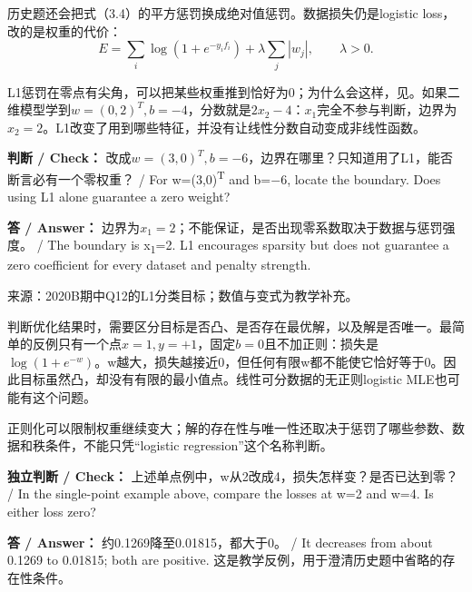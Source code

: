 

历史题还会把式（3.4）的平方惩罚换成绝对值惩罚。数据损失仍是logistic loss，改的是权重的代价：
\[
E=\sum_i\log(1+e^{-y_i f_i})+\lambda\sum_j|w_j|,\qquad\lambda>0.
\tag{3.6a}
\]


L1惩罚在零点有尖角，可以把某些权重推到恰好为0；为什么会这样，见。如果二维模型学到\(w=(0,2)^T,b=-4\)，分数就是\(2x_2-4\)：\(x_1\)完全不参与判断，边界为\(x_2=2\)。L1改变了用到哪些特征，并没有让线性分数自动变成非线性函数。


\textbf{判断 / Check：} 改成\(w=(3,0)^T,b=-6\)，边界在哪里？只知道用了L1，能否断言必有一个零权重？ / For w=(3,0)\textsuperscript{T} and b=\ensuremath{-}6, locate the boundary. Does using L1 alone guarantee a zero weight?


\textbf{答 / Answer：} 边界为\(x_1=2\)；不能保证，是否出现零系数取决于数据与惩罚强度。 / The boundary is x\textsubscript{1}=2. L1 encourages sparsity but does not guarantee a zero coefficient for every dataset and penalty strength.


来源：2020B期中Q12的L1分类目标；数值与变式为教学补充。








判断优化结果时，需要区分目标是否凸、是否存在最优解，以及解是否唯一。最简单的反例只有一个点\(x=1,y=+1\)，固定\(b=0\)且不加正则：损失是\(\log(1+e^{-w})\)。w越大，损失越接近0，但任何有限w都不能使它恰好等于0。因此目标虽然凸，却没有有限的最小值点。线性可分数据的无正则logistic MLE也可能有这个问题。


正则化可以限制权重继续变大；解的存在性与唯一性还取决于惩罚了哪些参数、数据和秩条件，不能只凭“logistic regression”这个名称判断。


\textbf{独立判断 / Check：} 上述单点例中，w从2改成4，损失怎样变？是否已达到零？ / In the single-point example above, compare the losses at w=2 and w=4. Is either loss zero?


\textbf{答 / Answer：} 约0.1269降至0.01815，都大于0。 / It decreases from about 0.1269 to 0.01815; both are positive. 这是教学反例，用于澄清历史题中省略的存在性条件。





